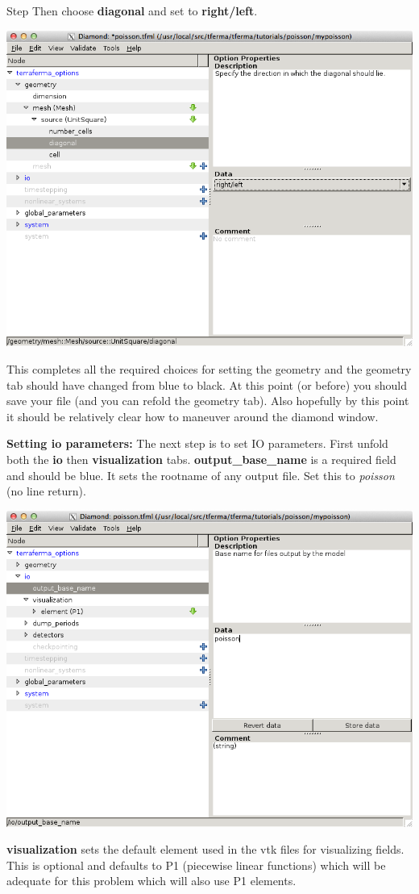 \begin{steps}{Step}
Then choose \textbf{diagonal} and set to \textbf{right/left}. 
\begin{center}
    \includegraphics[width=\diamondwidth]{figures/screendumps/diamond_poisson_03d.png}
\end{center}
This completes all the required choices for setting the geometry and
the geometry tab should have changed from blue to black. At this point
(or before) you should save your file (and you can refold the geometry
tab). Also hopefully by this point it
  should be relatively clear how to maneuver around the diamond
  window.  
\item \textbf{Setting io parameters:}  The next step is to set IO
  parameters.
First unfold both the \textbf{io} then \textbf{visualization} tabs.
\textbf{output\_base\_name} is a required field and should be blue. It sets the
rootname of any output file.  Set this to \emph{poisson} (no line
return). 
\begin{center}
    \includegraphics[width=\diamondwidth]{figures/screendumps/diamond_poisson_04.png}
\end{center}
\textbf{visualization} sets the default element used in the vtk files
for visualizing fields.  This is optional and defaults to P1 (piecewise
linear functions) which will be adequate for this problem which will
also use P1 elements.


\end{steps}
